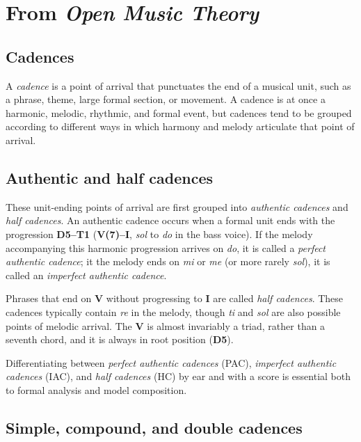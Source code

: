 \documentclass{book}
\begin{document}
\hypertarget{from-open-music-theory-1}{%
\section{\texorpdfstring{From \emph{Open Music
Theory}}{From Open Music Theory}}\label{from-open-music-theory-1}}

\hypertarget{cadences}{%
\subsection{Cadences}\label{cadences}}

A \emph{cadence} is a point of arrival that punctuates the end of a musical
unit, such as a phrase, theme, large formal section, or movement. A cadence is
at once a harmonic, melodic, rhythmic, and formal event, but cadences tend to
be grouped according to different ways in which harmony and melody articulate
that point of arrival.

\hypertarget{authentic-and-half-cadences}{%
\subsection{Authentic and half cadences}\label{authentic-and-half-cadences}}

These unit-ending points of arrival are first grouped into \emph{authentic
cadences} and \emph{half cadences}. An authentic cadence occurs when a formal
unit ends with the progression \textbf{D5--T1} (\textbf{V(7)--I}, \emph{sol}
to \emph{do} in the bass voice). If the melody accompanying this harmonic
progression arrives on \emph{do}, it is called a \emph{perfect authentic
cadence}; it the melody ends on \emph{mi} or \emph{me} (or more rarely
\emph{sol}), it is called an \emph{imperfect authentic cadence}.

Phrases that end on \textbf{V} without progressing to \textbf{I} are called
\emph{half cadences}. These cadences typically contain \emph{re} in the
melody, though \emph{ti} and \emph{sol} are also possible points of melodic
arrival. The \textbf{V} is almost invariably a triad, rather than a seventh
chord, and it is always in root position (\textbf{D5}).

Differentiating between \emph{perfect authentic cadences} (PAC),
\emph{imperfect authentic cadences} (IAC), and \emph{half cadences} (HC) by
ear and with a score is essential both to formal analysis and model
composition.

\hypertarget{simple-compound-and-double-cadences}{%
\subsection{Simple, compound, and double
cadences}\label{simple-compound-and-double-cadences}}
\end{document}
